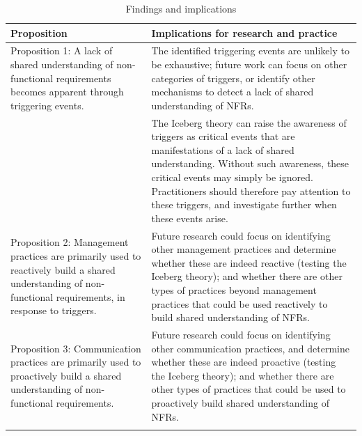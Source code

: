 \documentclass[smallextended]{svjour3}        %
\providecommand{\DIFaddbeginFL}{} %
\providecommand{\DIFaddendFL}{} %
\providecommand{\DIFdelbeginFL}{} %
\providecommand{\DIFdelendFL}{} %
\newcommand{\DIFscaledelfig}{0.5}
\newlength{\DIFdelgraphicswidth} %
\newlength{\DIFdelgraphicsheight} %
\newcommand{\DIFaddincludegraphics}[2][]{{\color{blue}\fbox{\DIFOincludegraphics[#1]{#2}}}} %
\newcommand{\DIFdelincludegraphics}[2][]{%
\sbox{\DIFdelgraphicsbox}{\DIFOincludegraphics[#1]{#2}}%
\settoboxwidth{\DIFdelgraphicswidth}{\DIFdelgraphicsbox} %
\settoboxtotalheight{\DIFdelgraphicsheight}{\DIFdelgraphicsbox} %
\scalebox{\DIFscaledelfig}{%
\parbox[b]{\DIFdelgraphicswidth}{\usebox{\DIFdelgraphicsbox}\\[-\baselineskip] \rule{\DIFdelgraphicswidth}{0em}}\llap{\resizebox{\DIFdelgraphicswidth}{\DIFdelgraphicsheight}{%
\setlength{\unitlength}{\DIFdelgraphicswidth}%
\begin{picture}(1,1)%
\thicklines\linethickness{2pt} %
{\color[rgb]{1,0,0}\put(0,0){\framebox(1,1){}}}%
{\color[rgb]{1,0,0}\put(0,0){\line( 1,1){1}}}%
{\color[rgb]{1,0,0}\put(0,1){\line(1,-1){1}}}%
\end{picture}%
}\hspace*{3pt}}} %
} %
\DeclareRobustCommand{\DIFaddbeginFL}{\DIFOaddbeginFL \let\includegraphics\DIFaddincludegraphics} %
\DeclareRobustCommand{\DIFaddendFL}{\DIFOaddendFL \let\includegraphics\DIFOincludegraphics} %
\DeclareRobustCommand{\DIFdelbeginFL}{\DIFOdelbeginFL \let\includegraphics\DIFdelincludegraphics} %
\DeclareRobustCommand{\DIFdelendFL}{\DIFOaddendFL \let\includegraphics\DIFOincludegraphics} %
\begin{document}
\begin{table}[!h]

\centering
\caption{Findings and implications}
\label{tab:implications}
\DIFdelbeginFL %
\DIFdelendFL \DIFaddbeginFL \begin{tabular}{p{4cm}p{7.7cm}} \DIFaddendFL %

\toprule 
Proposition  & Implications for research and practice \\
\midrule 

Proposition 1: A lack of shared understanding of non-functional requirements
becomes apparent through triggering events. 
& The identified triggering events are unlikely to be exhaustive; future work can focus on other categories of triggers, or identify other mechanisms to detect a lack of shared understanding of NFRs. 
\\

\addlinespace

& The Iceberg theory can raise the awareness of triggers as critical events that are manifestations of a lack of shared understanding. Without such awareness, these critical events may simply be ignored. Practitioners should therefore pay attention to these triggers, and investigate further when these events arise. \\

\addlinespace 

Proposition 2: Management practices are primarily used to reactively build a
shared understanding of non-functional requirements, in response to triggers.
& 
Future research could focus on identifying other management practices and determine whether these are indeed reactive (testing the Iceberg theory); and whether there are other types of practices beyond management practices that could be used reactively to build shared understanding of NFRs.
\\

\addlinespace 

Proposition 3: Communication practices are primarily used to proactively
build a shared understanding of non-functional requirements.
& Future research could focus on identifying other communication practices, and determine whether these are indeed proactive (testing the Iceberg theory); and whether there are other types of practices that could be used to proactively build shared understanding of NFRs.
\\

\addlinespace 


\end{tabular}
\end{table}
\end{document}
